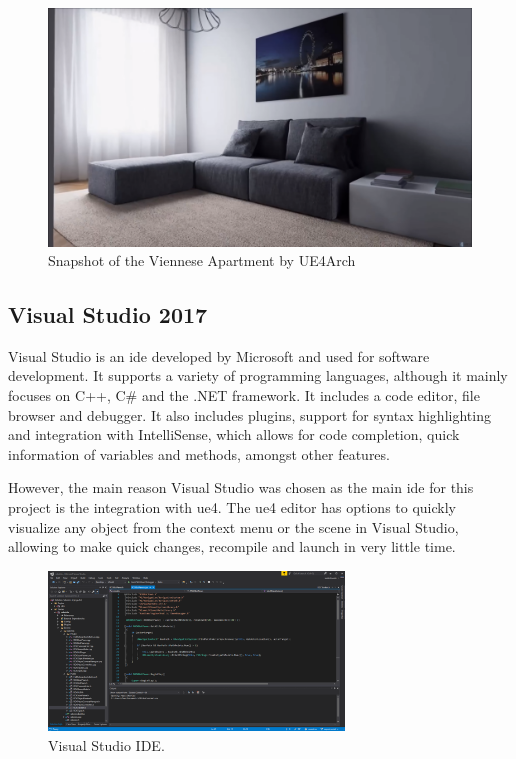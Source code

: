 \begin{figure}[h]
	\includegraphics[scale=0.2]{archivos/london_apartment.png}
	\centering
	\caption[Snapshot of the Viennese Apartment by UE4Arch]{Snapshot of the Viennese Apartment by UE4Arch\footnotemark}
	\label{fig:london_apartment}
\end{figure}

\subsection{Visual Studio 2017}
Visual Studio is an \gls{ide} developed by Microsoft and used for software development. It supports a variety of programming languages, although it mainly focuses on C++, C\# and the .NET framework. It includes a code editor, file browser and debugger. It also includes plugins, support for syntax highlighting and integration with IntelliSense, which allows for code completion, quick information of variables and methods, amongst other features.

However, the main reason Visual Studio was chosen as the main \gls{ide} for this project is the integration with \gls{ue4}. The \gls{ue4} editor has options to quickly visualize any object from the context menu or the scene in Visual Studio, allowing to make quick changes, recompile and launch in very little time.

\begin{figure}[h]
	\includegraphics[width=0.7\textwidth]{archivos/vs_ide.png}
	\centering
	\caption{Visual Studio IDE.}
	\label{fig:visual_studio}
\end{figure}

